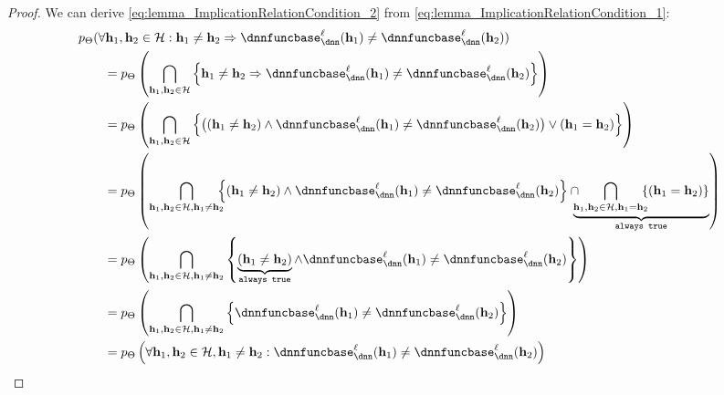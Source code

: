 \begin{proof}
    We can derive \cref{eq:lemma_ImplicationRelationCondition_2} from \cref{eq:lemma_ImplicationRelationCondition_1}:
        \begin{subequations}
    \begin{align}
        &\prob_{\Parameters}(\forall \hiddenstates_1,\hiddenstates_2\in \InputSet: \hiddenstates_1\neq\hiddenstates_2\Rightarrow \dnnfunclayer{\layer}(\hiddenstates_1)\neq\dnnfunclayer{\layer}(\hiddenstates_2)) \nonumber \\
        &\qquad = \prob_{\Parameters}\left(\bigcap_{\hiddenstates_1,\hiddenstates_2\in \InputSet} \left\{ \hiddenstates_1\neq\hiddenstates_2\Rightarrow \dnnfunclayer{\layer}(\hiddenstates_1)\neq\dnnfunclayer{\layer}(\hiddenstates_2) \right\}\right) \\
        &\qquad = \prob_{\Parameters}\left(\bigcap_{\hiddenstates_1,\hiddenstates_2\in \InputSet} \left\{ \big((\hiddenstates_1\neq\hiddenstates_2)\land \dnnfunclayer{\layer}(\hiddenstates_1)\neq\dnnfunclayer{\layer}(\hiddenstates_2)\big) \lor (\hiddenstates_1 = \hiddenstates_2) \right\}\right) \\
        &\qquad = \prob_{\Parameters}\left(\bigcap_{\hiddenstates_1,\hiddenstates_2\in \InputSet, \hiddenstates_1 \neq \hiddenstates_2}\!\!\!\! \left\{ (\hiddenstates_1\neq\hiddenstates_2)\land \dnnfunclayer{\layer}(\hiddenstates_1)\neq\dnnfunclayer{\layer}(\hiddenstates_2) \right\} \cap 
        \!\!\!\!\underbrace{\bigcap_{\hiddenstates_1,\hiddenstates_2\in \InputSet, \hiddenstates_1 = \hiddenstates_2}\!\!\!\! \left\{ (\hiddenstates_1 = \hiddenstates_2) \right\}}_{\texttt{always true}}\right) \\
        &\qquad = \prob_{\Parameters}\left(\bigcap_{\hiddenstates_1,\hiddenstates_2\in \InputSet, \hiddenstates_1 \neq \hiddenstates_2} \left\{ \underbrace{(\hiddenstates_1\neq\hiddenstates_2)}_{\texttt{always true}}\land \dnnfunclayer{\layer}(\hiddenstates_1)\neq\dnnfunclayer{\layer}(\hiddenstates_2) \right\}\right) \\
        &\qquad = \prob_{\Parameters}\left(\bigcap_{\hiddenstates_1,\hiddenstates_2\in \InputSet, \hiddenstates_1 \neq \hiddenstates_2} \left\{\dnnfunclayer{\layer}(\hiddenstates_1)\neq\dnnfunclayer{\layer}(\hiddenstates_2) \right\}\right) \\
        &\qquad = \prob_{\Parameters}\left(\forall \hiddenstates_1,\hiddenstates_2\in \InputSet, \hiddenstates_1 \neq \hiddenstates_2: \dnnfunclayer{\layer}(\hiddenstates_1)\neq\dnnfunclayer{\layer}(\hiddenstates_2)  \right)
    \end{align}
    \end{subequations}
\end{proof}


